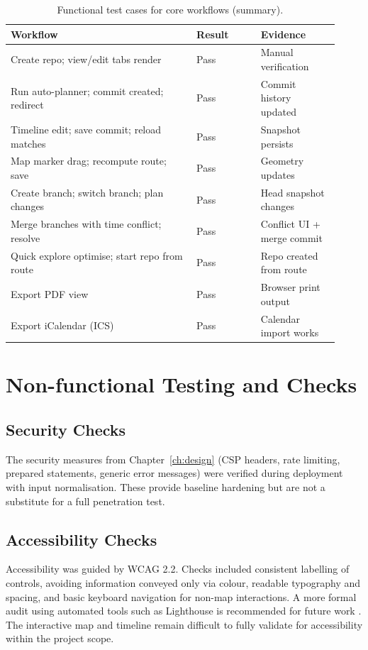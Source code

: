 \begin{table}[H]
\centering
\caption{Functional test cases for core workflows (summary).}
\label{tab:functional_tests}
\begin{tabular}{@{}p{0.52\linewidth}p{0.18\linewidth}p{0.22\linewidth}@{}}
\toprule
\textbf{Workflow} & \textbf{Result} & \textbf{Evidence} \\
\midrule
Create repo; view/edit tabs render              & Pass & Manual verification \\
Run auto-planner; commit created; redirect      & Pass & Commit history updated \\
Timeline edit; save commit; reload matches      & Pass & Snapshot persists \\
Map marker drag; recompute route; save          & Pass & Geometry updates \\
Create branch; switch branch; plan changes      & Pass & Head snapshot changes \\
Merge branches with time conflict; resolve      & Pass & Conflict UI + merge commit \\
Quick explore optimise; start repo from route   & Pass & Repo created from route \\
Export PDF view                                 & Pass & Browser print output \\
Export iCalendar (ICS)                          & Pass & Calendar import works \\
\bottomrule
\end{tabular}
\end{table}

\section{Non-functional Testing and Checks}
\subsection{Security Checks}
The security measures from Chapter~\ref{ch:design} (CSP headers, rate limiting, prepared statements, generic error messages) were verified during deployment with input normalisation. These provide baseline hardening but are not a substitute for a full penetration test.

\subsection{Accessibility Checks}
Accessibility was guided by WCAG 2.2. Checks included consistent labelling of controls, avoiding information conveyed only via colour, readable typography and spacing, and basic keyboard navigation for non-map interactions. A more formal audit using automated tools such as Lighthouse is recommended for future work \cite{ref_lighthouse_overview}. The interactive map and timeline
remain difficult to fully validate for accessibility within the project scope.

